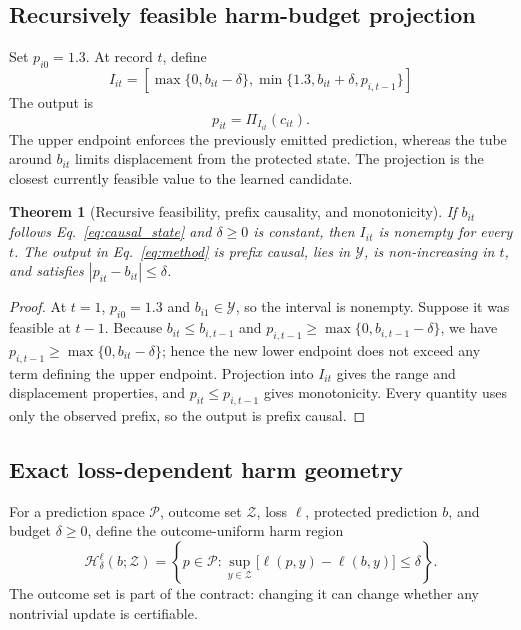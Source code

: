 \documentclass[11pt]{article}
\newtheorem{theorem}{Theorem}
\begin{document}
\subsection{Recursively feasible harm-budget projection}

Set $p_{i0}=1.3$. At record $t$, define
\begin{equation}
  I_{it}=\left[
  \max\{0,b_{it}-\delta\},
  \min\{1.3,b_{it}+\delta,p_{i,t-1}\}
  \right]
  \label{eq:feasible_interval}
\end{equation}
The output is
\begin{equation}
  p_{it}=\Pi_{I_{it}}(c_{it}).
  \label{eq:method}
\end{equation}
The upper endpoint enforces the previously emitted prediction, whereas the tube around $b_{it}$ limits displacement from the protected state. The projection is the closest currently feasible value to the learned candidate.

\begin{theorem}[Recursive feasibility, prefix causality, and monotonicity]
\label{thm:pchp}
If $b_{it}$ follows Eq.~\eqref{eq:causal_state} and $\delta\geq0$ is constant, then $I_{it}$ is nonempty for every $t$. The output in Eq.~\eqref{eq:method} is prefix causal, lies in $\mathcal Y$, is non-increasing in $t$, and satisfies $|p_{it}-b_{it}|\leq\delta$.
\end{theorem}
\begin{proof}
At $t=1$, $p_{i0}=1.3$ and $b_{i1}\in\mathcal Y$, so the interval is nonempty. Suppose it was feasible at $t-1$. Because $b_{it}\leq b_{i,t-1}$ and $p_{i,t-1}\geq\max\{0,b_{i,t-1}-\delta\}$, we have $p_{i,t-1}\geq\max\{0,b_{it}-\delta\}$; hence the new lower endpoint does not exceed any term defining the upper endpoint. Projection into $I_{it}$ gives the range and displacement properties, and $p_{it}\leq p_{i,t-1}$ gives monotonicity. Every quantity uses only the observed prefix, so the output is prefix causal.
\end{proof}

\subsection{Exact loss-dependent harm geometry}

For a prediction space $\mathcal P$, outcome set $\mathcal Z$, loss $\ell$, protected prediction $b$, and budget $\delta\geq0$, define the outcome-uniform harm region
\begin{equation}
  \mathcal H^{\ell}_{\delta}(b;\mathcal Z)
  =\left\{p\in\mathcal P:
  \sup_{y\in\mathcal Z}\bigl[\ell(p,y)-\ell(b,y)\bigr]\leq\delta
  \right\}.
  \label{eq:generic_harm_region}
\end{equation}
The outcome set is part of the contract: changing it can change whether any nontrivial update is certifiable.
\end{document}
